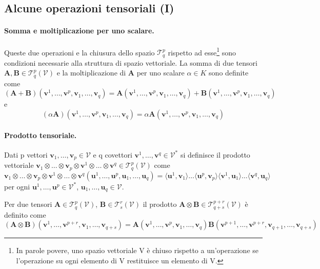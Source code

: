  \subsection{Alcune operazioni tensoriali (I)}
 
 \paragraph{Somma e moltiplicazione per uno scalare.} Queste due operazioni e la chiusura dello spazio
 $\mathcal{T}^p_q$ rispetto ad esse\footnote{In parole povere, uno spazio vettoriale V è chiuso rispetto
 a un'operazione se l'operazione su ogni elemento di V restituisce un elemento di V.} sono condizioni
 necessarie alla struttura di spazio vettoriale. La somma di due tensori $\bm{A},\bm{B} \in \mathcal{T}^p_q(\mathcal{V})$
 e la moltiplicazione di $\bm{A}$ per uno scalare $\alpha \in K$ sono definite come
\begin{equation}
 (\bm{A}+\bm{B})(\bm{v}^1,\dots,\bm{v}^p,\bm{v}_1,\dots,\bm{v}_q) = 
   \bm{A} (\bm{v}^1,\dots,\bm{v}^p,\bm{v}_1,\dots,\bm{v}_q) +
   \bm{B} (\bm{v}^1,\dots,\bm{v}^p,\bm{v}_1,\dots,\bm{v}_q)
\end{equation}
 e
\begin{equation}
 ( \alpha \bm{A} ) (\bm{v}^1,\dots,\bm{v}^p,\bm{v}_1,\dots,\bm{v}_q) = 
   \alpha \bm{A}   (\bm{v}^1,\dots,\bm{v}^p,\bm{v}_1,\dots,\bm{v}_q)
\end{equation}
 
 \paragraph{Prodotto tensoriale.} Dati p vettori $\bm{v}_1,\dots,\bm{v}_p \in \mathcal{V}$ e q covettori
 $\bm{v}^1,\dots,\bm{v}^q \in \mathcal{V}^*$ si definisce il prodotto vettoriale
 $\bm{v}_1 \otimes \dots \otimes \bm{v}_p \otimes \bm{v}^1 \otimes \dots \otimes \bm{v}^q \in \mathcal{T}^p_q
 (\mathcal{V})$ come
\begin{equation}
  \bm{v}_1 \otimes \dots \otimes \bm{v}_p \otimes \bm{v}^1 \otimes \dots \otimes \bm{v}^q 
  (\bm{u}^1,\dots,\bm{u}^p,\bm{u}_1,\dots,\bm{u}_q) = 
  \langle \bm{u}^1 ,\bm{v}_1 \rangle \dots \langle \bm{u}^p ,\bm{v}_p \rangle
  \langle \bm{v}^1 ,\bm{u}_1 \rangle \dots \langle \bm{v}^q ,\bm{u}_q \rangle
\end{equation}
 per ogni $\bm{u}^1,\dots,\bm{u}^p \in \mathcal{V}^*$, $\bm{u}_1,\dots,\bm{u}_q \in \mathcal{V}$.
 
 \noindent
 Per due tensori $\bm{A} \in \mathcal{T}^p_q(\mathcal{V})$, $\bm{B} \in \mathcal{T}^r_s(\mathcal{V})$
 il prodotto $\bm{A} \otimes \bm{B} \in \mathcal{T}^{p+r}_{q+s}(\mathcal{V})$ è definito come
\begin{equation}
 (\bm{A}\otimes\bm{B})(\bm{v}^1,\dots,\bm{v}^{p+r},\bm{v}_1,\dots,\bm{v}_{q+s}) = 
   \bm{A} (\bm{v}^1,\dots,\bm{v}^p,\bm{v}_1,\dots,\bm{v}_q)
   \bm{B} (\bm{v}^{p+1},\dots,\bm{v}^{p+r},\bm{v}_{q+1},\dots,\bm{v}_{q+s})
\end{equation}

